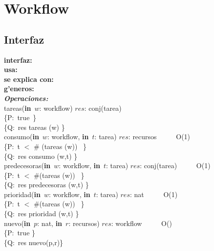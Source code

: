 \documentclass[a4paper,10pt]{article}
\begin{document}
\tableofcontents

\newpage


\section{Workflow}
\subsection{Interfaz}

\indent \noindent \textbf{interfaz:} \\
\indent \textbf{usa:}\\
\indent \textbf{se explica con:} \\
\indent \textbf{g'eneros:} \\



\noindent \textbf{\textsl{Operaciones:}}\\

\noindent tareas(\textbf{in}\ $w$: workflow)  \en $res$: conj(tarea) \ \ \ \ \ \\
\indent \{P:\ true\ \}  \\
\indent \{Q:\ res \igobs tareas (w) \}\\

\noindent consumo(\textbf{in}\ $w$: workflow, \textbf{in}\ $t$: tarea)  \en $res$: recursos \ \ \ \ \ O(1)\\
\indent \{P:\ t $<$ $\#$ (tareas (w)) \ \}  \\
\indent \{Q:\ res \igobs consumo (w,t) \}\\

\noindent predecesoras(\textbf{in}\ $w$: workflow, \textbf{in}\ $t$: tarea)  \en $res$: conj(tarea) \ \ \ \ \ O(1)\\
\indent \{P:\ t $<$ $\#$(tareas (w)) \ \}  \\
\indent \{Q:\ res \igobs predecesoras (w,t) \}\\

\noindent prioridad(\textbf{in}\ $w$: workflow, \textbf{in}\ $t$: tarea)  \en $res$: nat \ \ \ \ \ O(1)\\
\indent \{P:\ t $<$ $\#$(tareas (w)) \ \}  \\
\indent \{Q:\ res \igobs prioridad (w,t) \}\\

\noindent nuevo(\textbf{in}\ $p$: nat, \textbf{in}\ $r$: recursos) \en $res$: workflow \ \ \ \ \ O() \\
\indent \{P:\ true \}\\
\indent \{Q:\ res  \igobs  nuevo(p,r)\}\\
\end{document}
